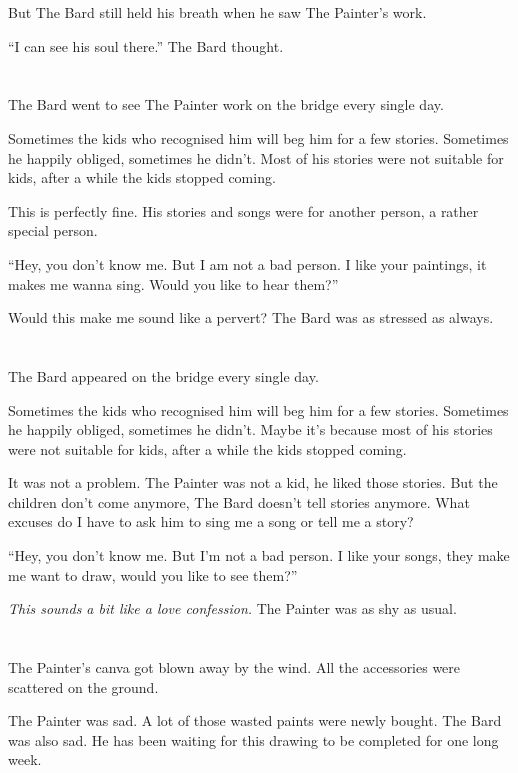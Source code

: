 \documentclass{article}
\begin{document}
But The Bard still held his breath when he saw The Painter's work.

“I can see his soul there.” The Bard thought.

\section{} %
The Bard went to see The Painter work on the bridge every single day.

Sometimes the kids who recognised him will beg him for a few stories. Sometimes he happily obliged, sometimes he didn't. Most of his stories were not suitable for kids, after a while the kids stopped coming.

This is perfectly fine. His stories and songs were for another person, a rather special person.

“Hey, you don't know me. But I am not a bad person. I like your paintings, it makes me wanna sing. Would you like to hear them?”

Would this make me sound like a pervert? The Bard was as stressed as always.

\section{} %
The Bard appeared on the bridge every single day.

Sometimes the kids who recognised him will beg him for a few stories. Sometimes he happily obliged, sometimes he didn't. Maybe it's because most of his stories were not suitable for kids, after a while the kids stopped coming.

It was not a problem. The Painter was not a kid, he liked those stories.
But the children don't come anymore, The Bard doesn't tell stories anymore. What excuses do I have to ask him to sing me a song or tell me a story?

“Hey, you don't know me. But I'm not a bad person. I like your songs, they make me want to draw, would you like to see them?”

\textit{This sounds a bit like a love confession.}
The Painter was as shy as usual.

\section{} %
The Painter's canva got blown away by the wind. All the accessories were scattered on the ground.

The Painter was sad. A lot of those wasted paints were newly bought. The Bard was also sad. He has been waiting for this drawing to be completed for one long week.
\end{document}

